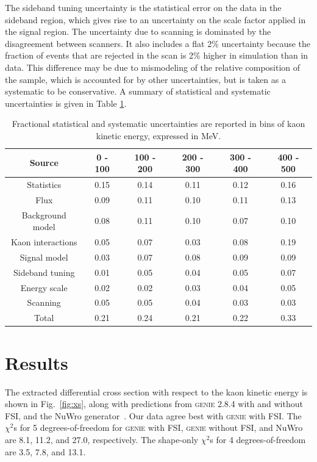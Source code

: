 \documentclass[aps,prl,preprint,showpacs,superscriptaddress,nofootinbib,floatfix,linenumbers]{revtex4}
\newcommand{\genie}{\textsc{genie}\xspace}
\begin{document}
The sideband tuning uncertainty is the statistical error on the data in the sideband region, which gives rise to an uncertainty on the scale factor applied in the signal region. The uncertainty due to scanning is dominated by the disagreement between scanners. It also includes a flat 2\% uncertainty because the fraction of events that are rejected in the scan is 2\% higher in simulation than in data. This difference may be due to mismodeling of the relative composition of the sample, which is accounted for by other uncertainties, but is taken as a systematic to be conservative. A summary of statistical and systematic uncertainties is given in Table \ref{tab:syst}.

\begingroup
\squeezetable
\begin{table}
\begin{tabular}{cccccc}
\hline\hline
Source & 0 - 100 & 100 - 200 & 200 - 300 & 300 - 400 & 400 - 500 \\ 
\hline
Statistics & 0.15 & 0.14 & 0.11 & 0.12 & 0.16 \\ 
Flux & 0.09 & 0.11 & 0.10 & 0.11 & 0.13 \\ 
Background model & 0.08 & 0.11 & 0.10 & 0.07 & 0.10 \\ 
Kaon interactions & 0.05 & 0.07 & 0.03 & 0.08 & 0.19 \\ 
Signal model & 0.03 & 0.07 & 0.08 & 0.09 & 0.09 \\ 
Sideband tuning & 0.01 & 0.05 & 0.04 & 0.05 & 0.07 \\ 
Energy scale & 0.02 & 0.02 & 0.03 & 0.04 & 0.05 \\ 
Scanning & 0.05 & 0.05 & 0.04 & 0.03 & 0.03 \\ 
\hline
Total & 0.21 & 0.24 & 0.21 & 0.22 & 0.33 \\ 
\hline\hline
\end{tabular}
\caption{Fractional statistical and systematic uncertainties are reported in bins of kaon kinetic energy, expressed in MeV.}
\label{tab:syst}
\end{table}
\endgroup


\section{Results}
\label{sec:results}

The extracted differential cross section with respect to the kaon kinetic energy is shown in Fig.~\ref{fig:xs}, along with predictions from \genie 2.8.4 with and without FSI, and the NuWro generator~\cite{nuwro, nuwroHP}. Our data agree best with \genie with FSI. The $\chi^{2}$s for 5 degrees-of-freedom for \genie with FSI, \genie without FSI, and NuWro are 8.1, 11.2, and 27.0, respectively. The shape-only $\chi^{2}$s for 4 degrees-of-freedom are 3.5, 7.8, and 13.1.
\end{document}

